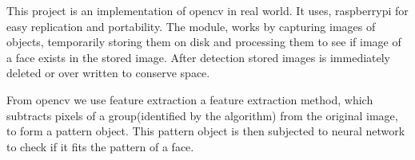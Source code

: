 This project is an implementation of opencv in real world. It uses, raspberrypi for easy replication and portability. The module, works
by capturing images of objects, temporarily storing them on disk and processing them to see if image of a face exists in
the stored image. After detection stored images is immediately deleted or over written to conserve space. 

From opencv we use feature extraction a feature extraction method, which subtracts pixels of a group(identified by the algorithm) from
the original image, to form a pattern object. This pattern object is then subjected to neural network to check if it fits the pattern of a face.
